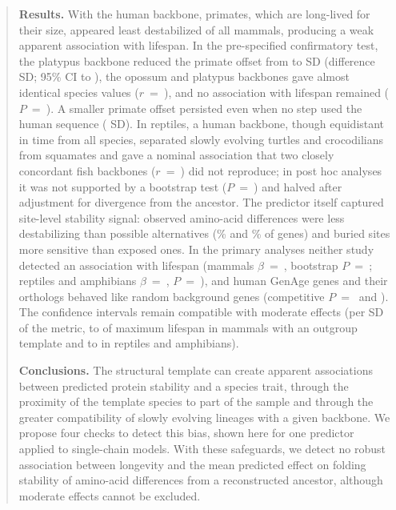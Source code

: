\documentclass[11pt]{article}
\begin{document}
\begin{abstract}
\noindent\textbf{Results.} With the human backbone, primates, which are long-lived for their size, appeared least destabilized of all mammals, producing a weak apparent association with lifespan. In the pre-specified confirmatory test, the platypus backbone reduced the primate offset from \MEOffHum{} to \MEOffPla{} SD (difference \MEaEst{} SD; 95\% CI \MEaLo{} to \MEaHi), the opossum and platypus backbones gave almost identical species values ($r$~=~\MErOpPl), and no association with lifespan remained ($P$~=~\MEcP). A smaller primate offset persisted even when no step used the human sequence (\MSixOffMsa{} SD). In reptiles, a human backbone, though equidistant in time from all species, separated slowly evolving turtles and crocodilians from squamates and gave a nominal association that two closely concordant fish backbones ($r$~=~\RTplRCoel) did not reproduce; in post hoc analyses it was not supported by a bootstrap test ($P$~=~\RPHHuBootP) and halved after adjustment for divergence from the ancestor. The predictor itself captured site-level stability signal: observed amino-acid differences were less destabilizing than possible alternatives (\MCOneFrac\% and \RCOneFrac\% of genes) and buried sites more sensitive than exposed ones. In the primary analyses neither study detected an association with lifespan (mammals $\beta$~=~\MPOneBeta, bootstrap $P$~=~\MPOneP; reptiles and amphibians $\beta$~=~\RPOneBeta, $P$~=~\RPOneP), and human GenAge genes and their orthologs behaved like random background genes (competitive $P$~=~\MPTwoCompP{} and \RPTwoCompP). The confidence intervals remain compatible with moderate effects (per SD of the metric, \MPlatypusPctLo{} to \MPlatypusPctHi{} of maximum lifespan in mammals with an outgroup template and \RPrimaryPctLo{} to \RPrimaryPctHi{} in reptiles and amphibians).

\noindent\textbf{Conclusions.} The structural template can create apparent associations between predicted protein stability and a species trait, through the proximity of the template species to part of the sample and through the greater compatibility of slowly evolving lineages with a given backbone. We propose four checks to detect this bias, shown here for one predictor applied to single-chain models. With these safeguards, we detect no robust association between longevity and the mean predicted effect on folding stability of amino-acid differences from a reconstructed ancestor, although moderate effects cannot be excluded.
\end{abstract}
\end{document}
